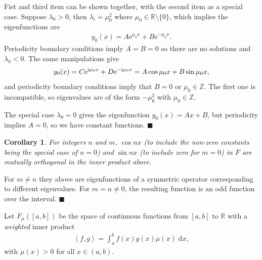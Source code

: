 \documentclass[letter-paper]{tufte-book}
\newtheorem{corollary}[theorem]{\color{pastel-blue}Corollary}
\newenvironment{proof}[1][Proof]{\begin{trivlist}
\item[\hskip \labelsep {\bfseries #1}]}{\end{trivlist}}
\newcommand{\ex}{\mathrm{e}}
\newcommand{\zi}{{\rm i}}
\newcommand{\inner}[2]{\left\langle #1, #2\right\rangle}
\newcommand{\qed}{\hfill$\blacksquare$}
\begin{document}
\begin{proof}
  Fist and third item can be shown together, with the second item as a special case. Suppose $\lambda_0 > 0$, then $\lambda_i = \mu_0^2$ where $\mu_0 \in \mathbb{R} \setminus \{0\}$, which implies the eigenfunctions are
  \begin{align*}
    y_0(x) = A\ex^{\mu_0 x} + B\ex^{-\mu_0 x}.
  \end{align*}
  Periodicity boundary conditions imply $A=B=0$ so there are no solutions and $\lambda_0 < 0$. The same manipulations give
  \begin{align*}
    y_0(x) = C\ex^{\zi\mu_0 x} + D\ex^{-\zi\mu_0 x} = A\cos\mu_0 x + B\sin\mu_0 x,
  \end{align*}
  and periodicity boundary conditions imply that $B=0$ or $\mu_0 \in \mathbb{Z}$. The first one is incompatible, so eigenvalues are of the form $-\mu_0^2$ with $\mu_0\in\mathbb{Z}$.
  
  The special case $\lambda_0 = 0$ gives the eigenfunction $y_0(x) = Ax + B$, but periodicity implies $A=0$, so we have constant functions. \qed
\end{proof}

\begin{corollary}
  For integers $n$ and $m$, $\cos nx$ (to include the non-zero constants being the special case of $n=0$) and $\sin nx$ (to include zero for $m=0$) in $F$ are mutually orthogonal in the inner product above.
\end{corollary}

\begin{proof}
  For $m\neq n$ they above are eigenfunctions of a symmetric operator corresponding to different eigenvalues. For $m=n\neq 0$, the resulting function is an odd function over the interval. \qed
\end{proof}

Let $F_\mu([a,b])$ be the space of continuous functions from $[a,b]$ to $\mathbb{R}$ with a \emph{weighted} inner product
\begin{align}
  \inner{f}{g} = \int_a^b f(x) g(x) \mu(x)\; \mathrm{d}x,
\end{align}
with $\mu(x) > 0$ for all $x\in(a,b)$.
\end{document}
